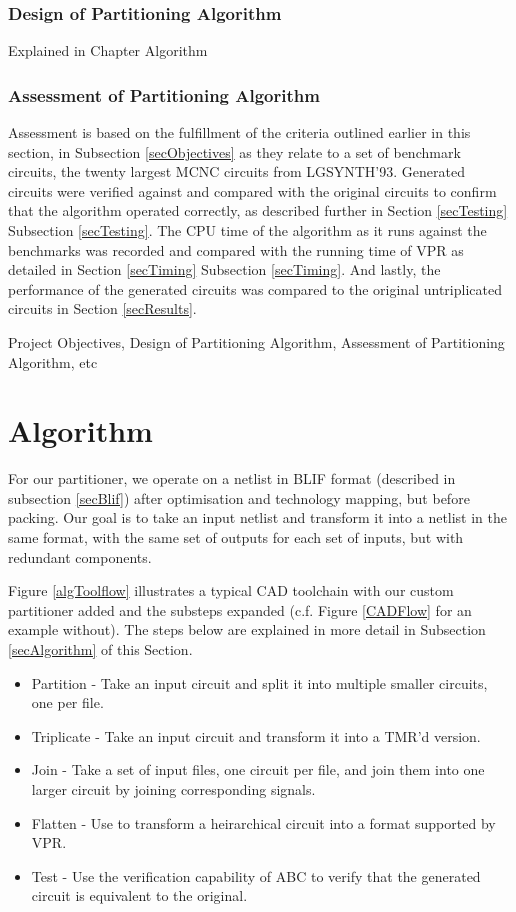 \documentclass[12pt,final,oneside]{dwThesis} %
\begin{document}
         \subsection{Design of Partitioning Algorithm} Explained in Chapter
         Algorithm \subsection{Assessment of
            Partitioning Algorithm} Assessment is based on the fulfillment of
         the criteria outlined earlier in this section, in Subsection
         \ref{secObjectives} as they relate to a set of benchmark circuits, the
         twenty largest MCNC circuits from LGSYNTH'93.  Generated circuits were
         verified against and compared with the original circuits to confirm
         that the algorithm operated correctly, as described further in Section
         \ref{secTesting} Subsection \ref{secTesting}.  The \gls{CPU} time of
         the algorithm as it runs against the benchmarks was recorded and
         compared with the running time of \gls{VPR} as detailed in Section
         \ref{secTiming} Subsection \ref{secTiming}.  And lastly, the
         performance of the generated circuits was compared to the original
         untriplicated circuits in Section \ref{secResults}.

 Project Objectives, Design of Partitioning Algorithm, Assessment of
 Partitioning Algorithm, etc


   \chapter{Algorithm} For our partitioner, we operate on a netlist in
   \gls{BLIF} format (described in subsection \ref{secBlif}) after optimisation
   and technology mapping, but before packing. Our goal is to take an input
   netlist and transform it into a netlist in the same format, with the same
   set of outputs for each set of inputs, but with redundant components.


   Figure \ref{algToolflow} illustrates a typical \gls{CAD} toolchain with our
   custom partitioner added and the substeps expanded (c.f. Figure
   \ref{CADFlow} for an example without). The steps below are explained in more
   detail in Subsection \ref{secAlgorithm} of this Section.  \begin{itemize}
      \item Partition - Take an input circuit and split it into multiple
            smaller circuits, one per file.
      \item Triplicate - Take an input circuit and transform it into a TMR'd
            version.
      \item Join - Take a set of input files, one circuit per file, and join
            them into one larger circuit by joining corresponding signals.
      \item Flatten - Use  to transform a heirarchical circuit into a
            format supported by VPR.
      \item Test - Use the verification capability of \gls{ABC} to verify that
            the generated circuit is equivalent to the original.  \end{itemize}
   
\end{document}
